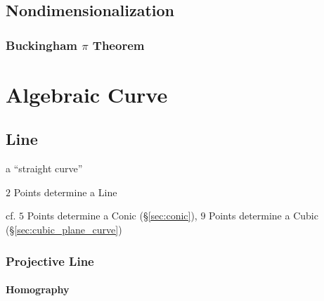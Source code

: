 \subsection{Nondimensionalization}\label{sec:nondimensionalization}

\subsubsection{Buckingham $\pi$ Theorem}\label{sec:buckingham_pi}



\section{Algebraic Curve}\label{sec:algebraic_curve}


\subsection{Line}\label{sec:line}

a ``straight curve''

$2$ Points determine a Line

cf. $5$ Points determine a Conic (\S\ref{sec:conic}), $9$ Points determine a
Cubic (\S\ref{sec:cubic_plane_curve})



\subsubsection{Projective Line}\label{sec:projective_line}




\paragraph{Homography}\label{sec:homography}\hfill



